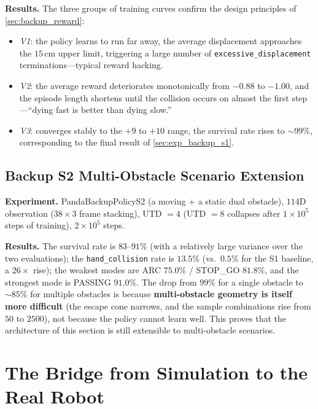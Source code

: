 \textbf{Results.} The three groups of training curves confirm the design principles of \cref{sec:backup_reward}:
\begin{itemize}
  \item \emph{V1}: the policy learns to run far away, the average displacement approaches the $15$\,cm upper limit, triggering a large number of \texttt{excessive\_displacement} terminations---typical reward hacking.
  \item \emph{V2}: the average reward deteriorates monotonically from $-0.88$ to $-1.00$, and the episode length shortens until the collision occurs on almost the first step---``dying fast is better than dying slow.''
  \item \emph{V3}: converges stably to the $+9$ to $+10$ range, the survival rate rises to $\sim 99\%$, corresponding to the final result of \cref{sec:exp_backup_s1}.
\end{itemize}

\subsection{Backup S2 Multi-Obstacle Scenario Extension}\label{sec:exp_backup_s2}

\textbf{Experiment.} PandaBackupPolicyS2 (a moving $+$ a static dual obstacle), $114$D observation ($38 \times 3$ frame stacking), UTD $= 4$ (UTD $= 8$ collapses after $1 \times 10^5$ steps of training), $2 \times 10^5$ steps.

\textbf{Results.} The survival rate is $83$--$91\%$ (with a relatively large variance over the two evaluations); the \texttt{hand\_collision} rate is $13.5\%$ (vs.\ $0.5\%$ for the S1 baseline, a $26\times$ rise); the weakest modes are ARC $75.0\%$ / STOP\_GO $81.8\%$, and the strongest mode is PASSING $91.0\%$. The drop from $99\%$ for a single obstacle to $\sim 85\%$ for multiple obstacles is because \textbf{multi-obstacle geometry is itself more difficult} (the escape cone narrows, and the sample combinations rise from $50$ to $2500$), not because the policy cannot learn well. This proves that the architecture of this section is still extensible to multi-obstacle scenarios.

\section{The Bridge from Simulation to the Real Robot}\label{sec:sim_to_real_bridge}

